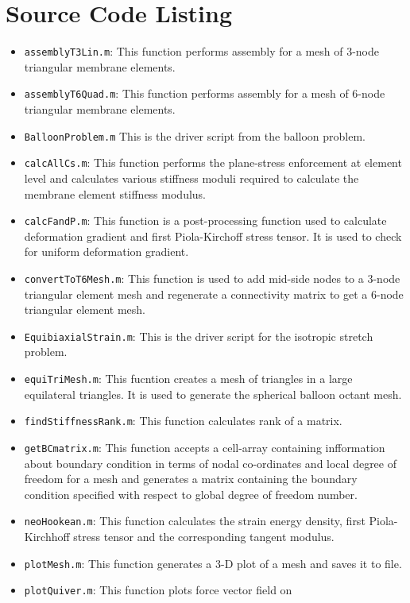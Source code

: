 \documentclass[../main.tex]{subfiles}
\begin{document}
\section{Source Code Listing}
\begin{itemize}
\item \texttt{assemblyT3Lin.m}: This function performs assembly for a
  mesh of 3-node triangular membrane elements.
\item \texttt{assemblyT6Quad.m}: This function performs assembly for a
  mesh of 6-node triangular membrane elements.
\item \texttt{BalloonProblem.m} This is the driver script from the
  balloon problem.
\item \texttt{calcAllCs.m}: This function performs the plane-stress
  enforcement at element level and calculates various stiffness moduli
  required to calculate the membrane element stiffness modulus.
\item \texttt{calcFandP.m}: This function is a post-processing
  function used to calculate deformation gradient and first
  Piola-Kirchoff stress tensor. It is used to check for uniform
  deformation gradient.
\item \texttt{convertToT6Mesh.m}: This function is used to add
  mid-side nodes to a 3-node triangular element mesh and regenerate a
  connectivity matrix to get a 6-node triangular element mesh.
\item \texttt{EquibiaxialStrain.m}: This is the driver script for the
  isotropic stretch problem.
\item \texttt{equiTriMesh.m}: This fucntion creates a mesh of
  triangles in a large equilateral triangles. It is used to generate
  the spherical balloon octant mesh.
\item \texttt{findStiffnessRank.m}: This function calculates rank of a
  matrix.
\item \texttt{getBCmatrix.m}: This function accepts a cell-array
  containing infformation about boundary condition in terms of nodal
  co-ordinates and local degree of freedom for a mesh and generates a
  matrix containing the boundary condition specified with respect to
  global degree of freedom number.
\item \texttt{neoHookean.m}: This function calculates the strain
  energy density, first Piola-Kirchhoff stress tensor and the
  corresponding tangent modulus.
\item \texttt{plotMesh.m}: This function generates a 3-D plot of a
  mesh and saves it to file.
\item \texttt{plotQuiver.m}: This function plots force vector field on

\end{itemize}
\end{document}
